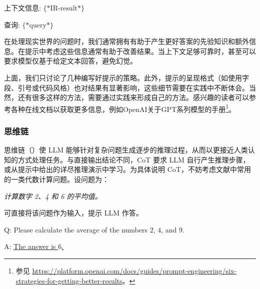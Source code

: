 \begin{itemize}
\begin{tcolorbox}
    \vspace{0.5em}

    上下文信息: $\{*\mathrm{IR\textrm{-}result}*\}$

    \vspace{0.3em}

    查询: $\{*\mathrm{query}*\}$

    \vspace{0.3em}

    \underline{\hspace{2em}}

    \endgroup

    \end{tcolorbox}
    \vspace{0.5em}

    在处理现实世界的问题时，我们通常拥有有助于产生更好答案的先验知识和额外信息。在提示中考虑这些信息通常有助于改善结果。当上下文足够可靠时，甚至可以要求模型仅基于给定文本回答，避免幻觉。

\end{itemize}
\vspace{0.5em}

上面，我们只讨论了几种编写好提示的策略。此外，提示的呈现格式（如使用字段、引号或代码风格）也对结果有显著影响，这些细节需要在实践中不断体会。当然，还有很多这样的方法，需要通过实践来形成自己的方法。感兴趣的读者可以参考各种在线文档以获取更多信息，例如OpenAI关于GPT系列模型的手册\footnote{参见 \url{https://platform.openai.com/docs/guides/prompt-engineering/six-strategies-for-getting-better-results}。}。

\subsubsection{思维链}
\label{sec:chain-of-thought}

\noindent 思维链（）使 LLM 能够针对复杂问题生成逐步的推理过程，从而以更接近人类认知的方式处理任务。与直接输出结论不同，CoT 要求 LLM 自行产生推理步骤，或从提示中给出的详尽推理演示中学习。为具体说明 CoT，不妨考虑文献中常用的一类代数计算问题。设问题为：

\vspace{0.8em}

\hspace{5em} \textit{计算数字 2、4 和 6 的平均值。}

\vspace{0.8em}

\noindent 可直接将该问题作为输入，提示 LLM 作答。

\vspace{0.5em}
\begin{tcolorbox}[frame style={draw=none}]
\begingroup
\setlength{\leftskip}{2em}
\setlength{\rightskip}{2em}

Q: Please calculate the average of the numbers $2$, $4$, and $9$.

\vspace{0.3em}

A: \underline{The answer is $6$.}

\endgroup
\end{tcolorbox}
\vspace{0.5em}

